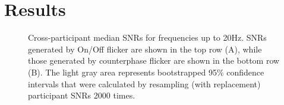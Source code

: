 \documentclass[
  12pt,
]{article}
\begin{document}
\section{Results}\label{results}

\begin{figure}


\caption{\label{fig-SNRData}Cross-participant median SNRs for
frequencies up to 20Hz. SNRs generated by On/Off flicker are shown in
the top row (A), while those generated by counterphase flicker are shown
in the bottom row (B). The light gray area represents bootstrapped 95\%
confidence intervals that were calculated by resampling (with
replacement) participant SNRs 2000 times.}

\end{figure}%
\end{document}
